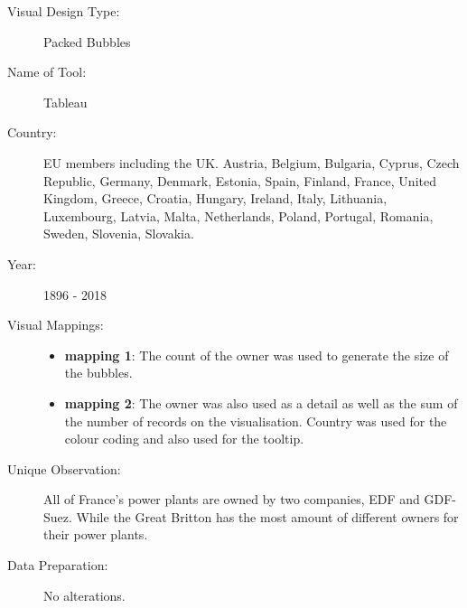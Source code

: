 \begin{description}
\item[Visual Design Type:]
Packed Bubbles
\item[Name of Tool:]
Tableau
\item[Country:]
EU members including the UK.  Austria, Belgium, Bulgaria, Cyprus, Czech Republic, Germany, Denmark, Estonia, Spain, Finland, France, United Kingdom, Greece, Croatia, Hungary, Ireland, Italy, Lithuania, Luxembourg, Latvia, Malta, Netherlands, Poland, Portugal, Romania, Sweden, Slovenia, Slovakia.
\item[Year:]
1896 - 2018
\item[Visual Mappings:]
\begin{itemize}
\tightlist
\item
  \textbf{mapping 1}: The count of the owner was used to generate the size of the bubbles. 
\end{itemize}

\begin{itemize}
\tightlist
\item
  \textbf{mapping 2}: The owner was also used as a detail as well as the sum of the number of records on the visualisation. Country was used for the colour coding and also used for the tooltip.
\end{itemize}
\item[Unique Observation:]
All of France’s power plants are owned by two companies, EDF and GDF-Suez. While the Great Britton has the most amount of different owners for their power plants.
\item[Data Preparation:]
No alterations.
\end{description}